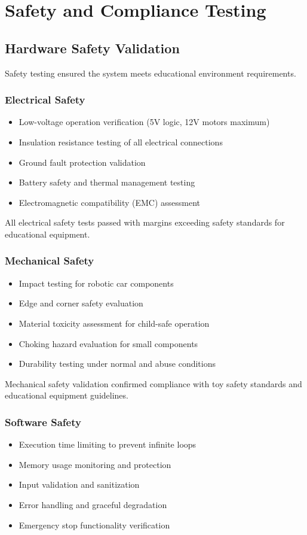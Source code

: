 \section{Safety and Compliance Testing}

\subsection{Hardware Safety Validation}

Safety testing ensured the system meets educational environment requirements.

\subsubsection{Electrical Safety}
\begin{itemize}
    \item Low-voltage operation verification (5V logic, 12V motors maximum)
    \item Insulation resistance testing of all electrical connections
    \item Ground fault protection validation
    \item Battery safety and thermal management testing
    \item Electromagnetic compatibility (EMC) assessment
\end{itemize}

All electrical safety tests passed with margins exceeding safety standards for educational equipment.

\subsubsection{Mechanical Safety}
\begin{itemize}
    \item Impact testing for robotic car components
    \item Edge and corner safety evaluation
    \item Material toxicity assessment for child-safe operation
    \item Choking hazard evaluation for small components
    \item Durability testing under normal and abuse conditions
\end{itemize}

Mechanical safety validation confirmed compliance with toy safety standards and educational equipment guidelines.

\subsubsection{Software Safety}
\begin{itemize}
    \item Execution time limiting to prevent infinite loops
    \item Memory usage monitoring and protection
    \item Input validation and sanitization
    \item Error handling and graceful degradation
    \item Emergency stop functionality verification
\end{itemize}

